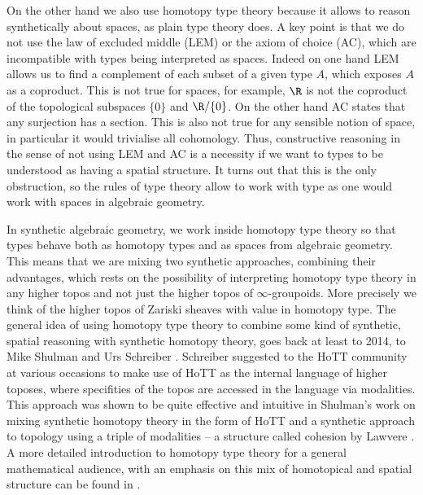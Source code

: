 On the other hand we also use homotopy type theory because it allows to reason synthetically about spaces, as plain type theory does. A key point is that we do not use the law of excluded middle (LEM) or the axiom of choice (AC), which are incompatible with types being interpreted as spaces. Indeed on one hand LEM allows us to find a complement of each subset of a given type $A$, which exposes $A$ as a coproduct.
This is not true for spaces, for example, $\R$ is not the coproduct of the topological subspaces $\{0\}$ and $\R/\{0\}$.
On the other hand AC states that any surjection has a section. This is also not true for any sensible notion of space, in particular it would trivialise all cohomology.
Thus, constructive reasoning in the sense of not using LEM and AC is a necessity if we want to types to be understood as having a spatial structure. It turns out that this is the only obstruction, so the rules of type theory allow to work with type as one would work with spaces in algebraic geometry.

In synthetic algebraic geometry, we work inside homotopy type theory so that types behave both as homotopy types and as spaces from algebraic geometry. This means that we are mixing two synthetic approaches, combining their advantages,
which rests on the possibility of interpreting homotopy type theory in any higher topos \cite{shulman2019all} and not just the higher topos of $\infty$-groupoids. More precisely we think of the higher topos of Zariski sheaves with value in homotopy type. %
The general idea of using homotopy type theory to combine some kind of synthetic, spatial reasoning with synthetic homotopy theory, goes back at least to 2014, to Mike Shulman and Urs Schreiber \cite{Schreiber_2014}.
Schreiber suggested to the HoTT community at various occasions to make use of HoTT as the internal language of higher toposes, where specifities of the topos are accessed in the language via modalities.
This approach was shown to be quite effective and intuitive in Shulman's \cite{shulman-Brouwer-fixed-point} work on mixing synthetic homotopy theory in the form of HoTT and a synthetic approach to topology using a triple of modalities -- a structure called cohesion by Lawvere \cite{Lawvere2007}. A more detailed introduction to homotopy type theory for a general mathematical audience, with an emphasis on this mix of homotopical and spatial structure can be found in \cite{shulman-logic-of-spaces}.

